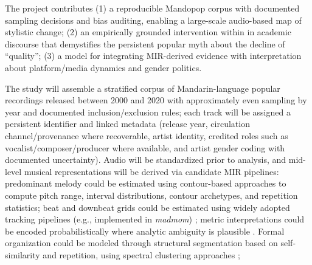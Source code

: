 \documentclass[11pt]{article}
\begin{document}



The project contributes (1) a reproducible Mandopop corpus with documented sampling decisions and bias auditing, enabling a large-scale audio-based map of stylistic change; (2) an empirically grounded intervention within in academic discourse that demystifies the persistent popular myth about the decline of ``quality''; (3) a model for integrating MIR-derived evidence with interpretation about platform/media dynamics and gender politics.



The study will assemble a stratified corpus of Mandarin-language popular recordings released between 2000 and 2020 with approximately even sampling by year and documented inclusion/exclusion rules; each track will be assigned a persistent identifier and linked metadata (release year, circulation channel/provenance where recoverable, artist identity, credited roles such as vocalist/composer/producer where available, and artist gender coding with documented uncertainty). Audio will be standardized prior to analysis, and mid-level musical representations will be derived via candidate MIR pipelines: predominant melody could be estimated using contour-based approaches \citep{salamon2012melody} to compute pitch range, interval distributions, contour archetypes, and repetition statistics; beat and downbeat grids could be estimated using widely adopted tracking pipelines (e.g., implemented in \textit{madmom}) \citep{bock2016madmom}; metric interpretations could be encoded probabilistically where analytic ambiguity is plausible \citep{declercq2016measuring}. Formal organization could be modeled through structural segmentation based on self-similarity and repetition, using spectral clustering approaches \citep{mcfee2014structure,nieto2020structure}; 
\end{document}
